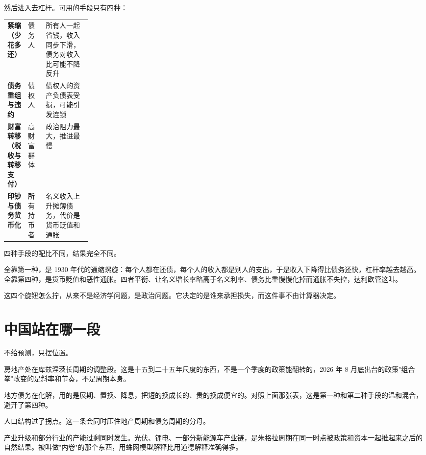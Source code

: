 然后进入去杠杆。可用的手段只有四种：

\begin{tablewrap}
\begin{xltabular}{\linewidth}{>{\raggedright\arraybackslash}p{0.20\linewidth}XX}
\toprule
{} &  &  \\
\midrule
\textbf{紧缩（少花多还）} & 债务人 & 所有人一起省钱，收入同步下滑，债务对收入比可能不降反升 \\
\textbf{债务重组与违约} & 债权人 & 债权人的资产负债表受损，可能引发连锁 \\
\textbf{财富转移（税收与转移支付）} & 高财富群体 & 政治阻力最大，推进最慢 \\
\textbf{印钞与债务货币化} & 所有持币者 & 名义收入上升摊薄债务，代价是货币贬值和通胀 \\
\bottomrule
\end{xltabular}
\end{tablewrap}

四种手段的配比不同，结果完全不同。

全靠第一种，是 1930 年代的通缩螺旋：每个人都在还债，每个人的收入都是别人的支出，于是收入下降得比债务还快，杠杆率越去越高。全靠第四种，是货币贬值和恶性通胀。四者平衡、让名义增长率略高于名义利率、债务比重慢慢化掉而通胀不失控，达利欧管这叫。

\begin{pullquote}{}
这四个旋钮怎么拧，从来不是经济学问题，是政治问题。它决定的是谁来承担损失，而这件事不由计算器决定。
\end{pullquote}

\section{中国站在哪一段}

不给预测，只摆位置。

房地产处在库兹涅茨长周期的调整段。这是十五到二十五年尺度的东西，不是一个季度的政策能翻转的，2026 年 8 月底出台的政策"组合拳"改变的是斜率和节奏，不是周期本身。

地方债务在化解，用的是展期、置换、降息，把短的换成长的、贵的换成便宜的。对照上面那张表，这是第一种和第二种手段的温和混合，避开了第四种。

人口结构过了拐点。这一条会同时压住地产周期和债务周期的分母。

产业升级和部分行业的产能过剩同时发生。光伏、锂电、一部分新能源车产业链，是朱格拉周期在同一时点被政策和资本一起推起来之后的自然结果。被叫做"内卷"的那个东西，用蛛网模型解释比用道德解释准确得多。

